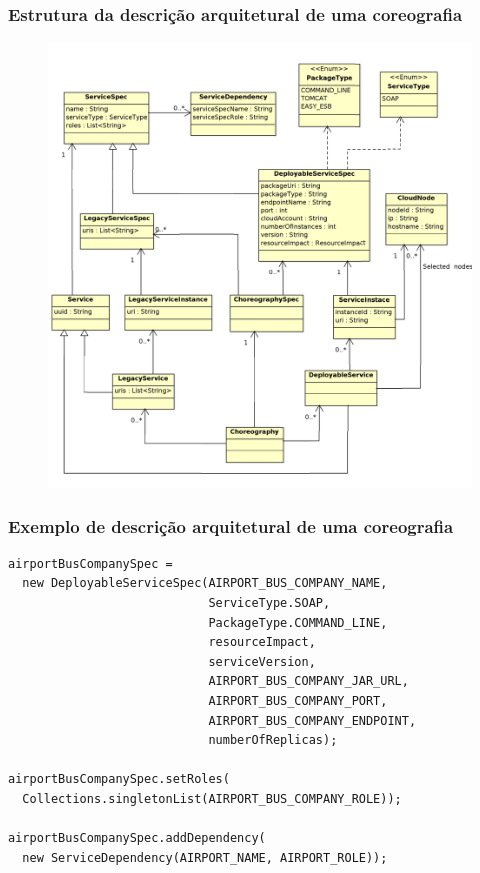 \documentclass{beamer}
\begin{document}
\begin{frame}
\frametitle{Estrutura da descrição arquitetural de uma coreografia}

\begin{figure}
\includegraphics[width=0.6\linewidth]{img/adl}
\end{figure}

\end{frame}


\begin{frame}[fragile]
\frametitle{Exemplo de descrição arquitetural de uma coreografia}

\begin{block}{}
{\scriptsize
\begin{lstlisting}[breaklines]
airportBusCompanySpec =
  new DeployableServiceSpec(AIRPORT_BUS_COMPANY_NAME, 
  							ServiceType.SOAP, 
  							PackageType.COMMAND_LINE, 
  							resourceImpact, 
  							serviceVersion, 
  							AIRPORT_BUS_COMPANY_JAR_URL, 
  							AIRPORT_BUS_COMPANY_PORT, 
  							AIRPORT_BUS_COMPANY_ENDPOINT, 
  							numberOfReplicas);

airportBusCompanySpec.setRoles(
  Collections.singletonList(AIRPORT_BUS_COMPANY_ROLE));

airportBusCompanySpec.addDependency(
  new ServiceDependency(AIRPORT_NAME, AIRPORT_ROLE));
\end{lstlisting}
}
\end{block}

\end{frame}

\end{document}
